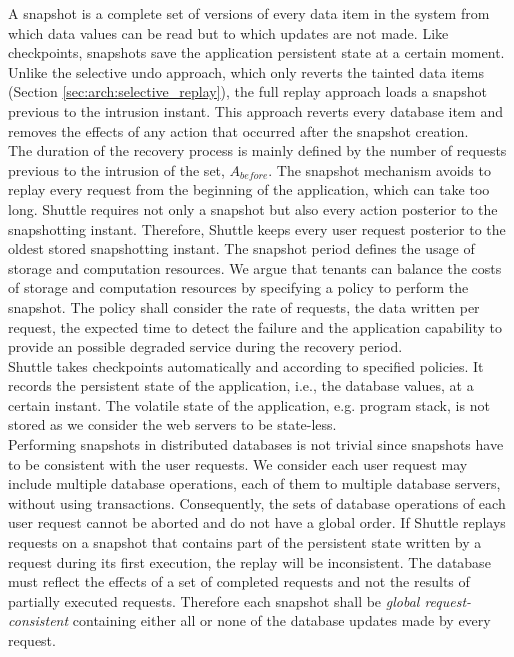 A snapshot is a complete set of versions of every data item in the system from which data values can be read but to which updates are not made. Like checkpoints, snapshots save the application persistent state at a certain moment. Unlike the selective undo approach, which only reverts the tainted data items (Section \ref{sec:arch:selective_replay}), the full replay approach loads a snapshot previous to the intrusion instant. This approach reverts every database item and removes the effects of any action that occurred after the snapshot creation. \\

The duration of the recovery process is mainly defined by the number of requests previous to the intrusion of the set, $A_{before}$. The snapshot mechanism avoids to replay every request from the beginning of the application, which can take too long. Shuttle requires not only a snapshot but also every action posterior to the snapshotting instant. Therefore, Shuttle keeps every user request posterior to the oldest stored snapshotting instant. The snapshot period defines the usage of storage and computation resources. We argue that tenants can balance the costs of storage and computation resources by specifying a policy to perform the snapshot. The policy shall consider the rate of requests, the data written per request, the expected time to detect the failure and the application capability to provide an possible degraded service during the recovery period. \\

Shuttle takes checkpoints automatically and according to specified policies. It records the persistent state of the application, i.e., the database values, at a certain instant. The volatile state of the application, e.g. program stack, is not stored as we consider the web servers to be state-less. \\


Performing snapshots in distributed databases is not trivial since snapshots have to be consistent with the user requests.  We consider each user request may include multiple database operations, each of them to multiple database servers, without using transactions. Consequently, the sets of database operations of each user request cannot be aborted and do not have a global order. If Shuttle replays requests on a snapshot that contains part of the persistent state written by a request during its first execution, the replay will be inconsistent. The database must reflect the effects of a set of completed requests and not the results of partially executed requests. Therefore each snapshot shall be \emph{global request-consistent} containing either all or none of the database updates made by every request.

